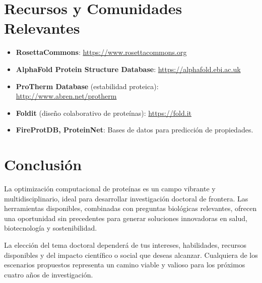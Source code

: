 \documentclass[12pt]{article}
\begin{document}
\section{Recursos y Comunidades Relevantes}

\begin{itemize}
    \item \textbf{RosettaCommons}: \url{https://www.rosettacommons.org}
    \item \textbf{AlphaFold Protein Structure Database}: \url{https://alphafold.ebi.ac.uk}
    \item \textbf{ProTherm Database} (estabilidad proteica): \url{http://www.abren.net/protherm}
    \item \textbf{Foldit} (diseño colaborativo de proteínas): \url{https://fold.it}
    \item \textbf{FireProtDB, ProteinNet}: Bases de datos para predicción de propiedades.
\end{itemize}

\section{Conclusión}

La optimización computacional de proteínas es un campo vibrante y multidisciplinario, ideal para desarrollar investigación doctoral de frontera. Las herramientas disponibles, combinadas con preguntas biológicas relevantes, ofrecen una oportunidad sin precedentes para generar soluciones innovadoras en salud, biotecnología y sostenibilidad.

La elección del tema doctoral dependerá de tus intereses, habilidades, recursos disponibles y del impacto científico o social que deseas alcanzar. Cualquiera de los escenarios propuestos representa un camino viable y valioso para los próximos cuatro años de investigación.
\end{document}
